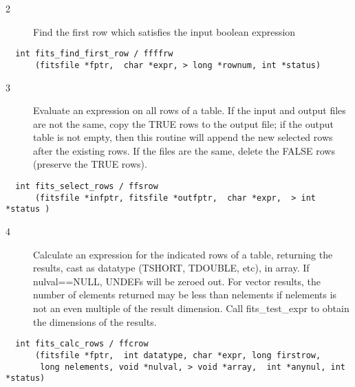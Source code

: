 \documentclass[11pt]{book}
\begin{document}
\begin{description}
\item[2 ] Find the first row which satisfies the input boolean expression \label{ffffrw}
\end{description}

\begin{verbatim}
  int fits_find_first_row / ffffrw
      (fitsfile *fptr,  char *expr, > long *rownum, int *status)
\end{verbatim}

\begin{description}
\item[3 ]Evaluate an expression on all rows of a table.  If the input and output
files are not the same, copy the TRUE rows to the output file; if the output
table is not empty, then this routine will append the new
selected rows after the existing rows.   If the
files are the same, delete the FALSE rows (preserve the TRUE rows). \label{ffsrow}
\end{description}

\begin{verbatim}
  int fits_select_rows / ffsrow
      (fitsfile *infptr, fitsfile *outfptr,  char *expr,  > int *status )
\end{verbatim}

\begin{description}
\item[4 ] Calculate an expression for the indicated rows of a table, returning
the results, cast as datatype (TSHORT, TDOUBLE, etc), in array.  If
nulval==NULL, UNDEFs will be zeroed out.  For vector results, the number
of elements returned may be less than nelements if nelements is not an
even multiple of the result dimension.  Call fits\_test\_expr to obtain
the dimensions of the results.  \label{ffcrow}
\end{description}

\begin{verbatim}
  int fits_calc_rows / ffcrow
      (fitsfile *fptr,  int datatype, char *expr, long firstrow,
       long nelements, void *nulval, > void *array,  int *anynul, int *status)
\end{verbatim}
\end{document}
